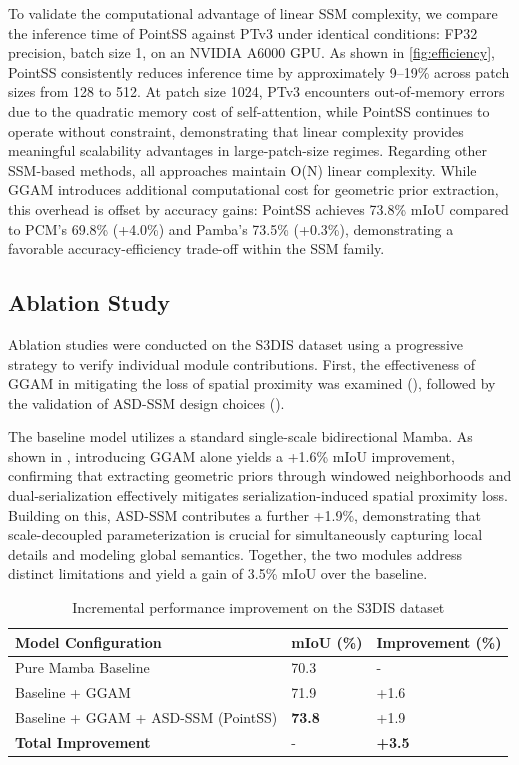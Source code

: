 \documentclass[a4paper,fleqn]{cas-sc}
\begin{document}
To validate the computational advantage of linear SSM complexity, we compare the inference time of PointSS against PTv3 under identical conditions: FP32 precision, batch size 1, on an NVIDIA A6000 GPU. As shown in \cref{fig:efficiency}, PointSS consistently reduces inference time by approximately 9--19\% across patch sizes from 128 to 512. At patch size 1024, PTv3 encounters out-of-memory errors due to the quadratic memory cost of self-attention, while PointSS continues to operate without constraint, demonstrating that linear complexity provides meaningful scalability advantages in large-patch-size regimes. Regarding other SSM-based methods, all approaches maintain O(N) linear complexity. While GGAM introduces additional computational cost for geometric prior extraction, this overhead is offset by accuracy gains: PointSS achieves 73.8\% mIoU compared to PCM's 69.8\% (+4.0\%) and Pamba's 73.5\% (+0.3\%), demonstrating a favorable accuracy-efficiency trade-off within the SSM family.

\subsection{Ablation Study}

Ablation studies were conducted on the S3DIS dataset using a progressive strategy to verify individual module contributions. First, the effectiveness of GGAM in mitigating the loss of spatial proximity was examined (), followed by the validation of ASD-SSM design choices ().

The baseline model utilizes a standard single-scale bidirectional Mamba. As shown in , introducing GGAM alone yields a +1.6\% mIoU improvement, confirming that extracting geometric priors through windowed neighborhoods and dual-serialization effectively mitigates serialization-induced spatial proximity loss. Building on this, ASD-SSM contributes a further +1.9\%, demonstrating that scale-decoupled parameterization is crucial for simultaneously capturing local details and modeling global semantics. Together, the two modules address distinct limitations and yield a gain of 3.5\% mIoU over the baseline.

\begin{table}[!t]
	\centering
	\caption{Incremental performance improvement on the S3DIS dataset}
	\label{tab:progressive_improvement}
	\begin{tabular}{lll}
		\toprule
		\textbf{Model Configuration} & \textbf{mIoU (\%)} & \textbf{Improvement (\%)} \\
		\midrule
		Pure Mamba Baseline & 70.3 & - \\
		Baseline + GGAM & 71.9 & +1.6 \\
		Baseline + GGAM + ASD-SSM (PointSS) & \textbf{73.8} & +1.9 \\
		\midrule
		\textbf{Total Improvement} & - & \textbf{+3.5} \\
		\bottomrule
	\end{tabular}
\end{table}
\end{document}

